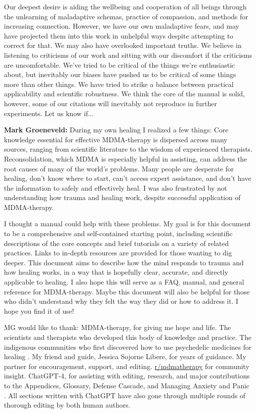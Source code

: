 \documentclass[12pt,letterpaper]{article}
\begin{document}
Our deepest desire is aiding the wellbeing and cooperation of all beings through the unlearning of maladaptive schemas, practice of compassion, and methods for increasing connection. However, we have our own maladaptive fears, and may have projected them into this work in unhelpful ways despite attempting to correct for that. We may also have overlooked important truths. We believe in listening to criticisms of our work and sitting with our discomfort if the criticisms are uncomfortable. We’ve tried to be critical of the things we’re enthusiastic about, but inevitably our biases have pushed us to be critical of some things more than other things. We have tried to strike a balance between practical applicability and scientific robustness. We think the core of the manual is solid, however, some of our citations will inevitably not reproduce in further experiments. Let us know if...

\textbf{Mark Groeneveld:} During my own healing I realized a few things: Core knowledge essential for effective MDMA-therapy is dispersed across many sources, ranging from scientific literature to the wisdom of experienced therapists. Reconsolidation, which MDMA is especially helpful in assisting, can address the root causes of many of the world's problems. Many people are desperate for healing, don't know where to start, can't access expert assistance, and don't have the information to safely and effectively heal. I was also frustrated by not understanding how trauma and healing work, despite successful application of MDMA-therapy.

I thought a manual could help with these problems. My goal is for this document to be a comprehensive and self-contained starting point, including scientific descriptions of the core concepts and brief tutorials on a variety of related practices. Links to in-depth resources are provided for those wanting to dig deeper. This document aims to describe how the mind responds to trauma and how healing works, in a way that is hopefully clear, accurate, and directly applicable to healing. I also hope this will serve as a FAQ, manual, and general reference for MDMA-therapy. Maybe this document will also be helpful for those who didn't understand why they felt the way they did or how to address it. I hope you find it of use!

MG would like to thank: MDMA-therapy, for giving me hope and life. The scientists and therapists who developed this body of knowledge and practice. The indigenous communities who first discovered how to use psychedelic medicines for healing \cite{celidwen2023Indigenous,davisOneRiver}. My friend and guide, Jessica Sojorne Libere, for years of guidance. My partner for encouragement, support, and editing. \href{https://www.reddit.com/r/mdmatherapy}{r/mdmatherapy} for community insight. ChatGPT-4, for assisting with editing, research, and major contributions to the Appendices, Glossary, Defense Cascade, and Managing Anxiety and Panic \cite{openaiGPT}. All sections written with ChatGPT have also gone through multiple rounds of thorough editing by both human authors.
\end{document}
